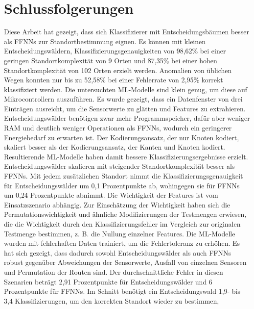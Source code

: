 \chapter{Schlussfolgerungen}
Diese Arbeit hat gezeigt, dass sich Klassifizierer mit Entscheidungsbäumen besser als FFNNs zur Standortbestimmung eignen.
Es können mit kleinen Entscheidungswäldern, Klassifizierungsgenauigkeiten von 98,62\% bei einer geringen Standortkomplexität von 9 Orten
und 87,35\% bei einer hohen Standortkomplexität von 102 Orten erzielt werden.
Anomalien von üblichen Wegen konnten nur bis zu 52,58\% bei einer Fehlerrate von 2,95\% korrekt klassifiziert werden.
\newline
\newline
Die untersuchten ML-Modelle sind klein genug, um diese auf Mikrocontrollern auszuführen.
Es wurde gezeigt, dass ein Datenfenster von drei Einträgen ausreicht, um die Sensorwerte zu glätten und Features zu extrahieren.
Entscheidungswälder benötigen zwar mehr Programmspeicher, dafür aber weniger RAM und deutlich weniger Operationen als FFNNs, wodurch
ein geringerer Energiebedarf zu erwarten ist.
\newline
\newline
Der Kodierungsansatz, der nur Knoten kodiert, skaliert besser als der Kodierungsansatz, der Kanten und Knoten kodiert.
Resultierende ML-Modelle haben damit bessere Klassifizierungsergebnisse erzielt.
Entscheidungswälder skalieren mit steigender Standortkomplexität besser als FFNNs.
Mit jedem zusätzlichen Standort nimmt die Klassifizierungsgenauigkeit für Entscheidungswälder um 0,1 Prozentpunkte ab,
wohingegen sie für FFNNs um 0,24 Prozentpunkte abnimmt.
\newline
\newline
Die Wichtigkeit der Features ist vom Einsatzszenario abhängig.
Zur Einschätzung der Wichtigkeit haben sich die Permutationswichtigkeit \cite{breiman2001random} und ähnliche Modifizierungen der Testmengen erwiesen,
die die Wichtigkeit durch den Klassifizierungsfehler im Vergleich zur originalen Testmenge bestimmen, z. B. die Nullung einzelner Features.
\newpage
Die ML-Modelle wurden mit fehlerhaften Daten trainiert, um die Fehlertoleranz zu erhöhen.
Es hat sich gezeigt, dass dadurch sowohl Entscheidungswälder als auch FFNNs robust gegenüber Abweichungen der Sensorwerte,
Ausfall von einzelnen Sensoren und Permutation der Routen sind.
Der durchschnittliche Fehler in diesen Szenarien beträgt 2,91 Prozentpunkte für Entscheidungswälder und 6 Prozentpunkte für FFNNs.
Im Schnitt benötigt ein Entscheidungswald 1,9- bis 3,4 Klassifizierungen, um den korrekten Standort wieder zu bestimmen,
